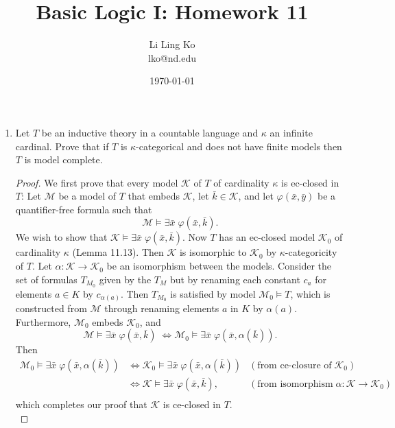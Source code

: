 \documentclass{article}
\begin{document}
\title{Basic Logic I: Homework 11}
\author{Li Ling Ko\\ lko@nd.edu}
\date{\today}
\maketitle

\begin{enumerate}[label={\bf Q\arabic*:}]
  \item Let $T$ be an inductive theory in a countable language and $\kappa$
    an infinite cardinal. Prove that if $T$ is $\kappa$-categorical and
    does not have finite models then $T$ is model complete.

    \begin{proof}
      We first prove that every model $\mathcal{K}$ of $T$ of cardinality
      $\kappa$ is ec-closed in $T$: Let $\mathcal{M}$ be a model of $T$
      that embeds $\mathcal{K}$, let $\bar{k}\in\mathcal{K}$, and let
      $\varphi(\bar{x},\bar{y})$ be a quantifier-free formula such that
      \[\mathcal{M}\models \exists\bar{x}\; \varphi(\bar{x},\bar{k}).\] We
      wish to show that $\mathcal{K}\models \exists\bar{x}\;
      \varphi(\bar{x},\bar{k})$. Now $T$ has an ec-closed model
      $\mathcal{K}_0$ of cardinality $\kappa$ (Lemma 11.13). Then
      $\mathcal{K}$ is isomorphic to $\mathcal{K}_0$ by
      $\kappa$-categoricity of $T$. Let
      $\alpha:\mathcal{K}\rightarrow\mathcal{K}_0$ be an isomorphism
      between the models. Consider the set of formulas $T_{M_0}$ given by
      the $T_M$ but by renaming each constant $c_a$ for elements $a\in K$
      by $c_{\alpha(a)}$. Then $T_{M_0}$ is satisfied by model
      $\mathcal{M}_0\models T$, which is constructed from $\mathcal{M}$
      through renaming elements $a$ in $K$ by $\alpha(a)$. Furthermore,
      $\mathcal{M}_0$ embeds $\mathcal{K}_0$, and
      \[\mathcal{M}\models \exists\bar{x}\; \varphi(\bar{x},\bar{k})\;
        \Leftrightarrow \mathcal{M}_0\models
        \exists\bar{x}\; \varphi(\bar{x},\alpha(\bar{k})).\]
      Then
      \begin{align*}
        \mathcal{M}_0\models \exists\bar{x}\;
          \varphi(\bar{x},\alpha(\bar{k})) &\Leftrightarrow
            \mathcal{K}_0\models \exists\bar{x}\;
            \varphi(\bar{x},\alpha(\bar{k})) &(\text{from ce-closure of}\;
            \mathcal{K}_0) \\
          &\Leftrightarrow \mathcal{K}\models
            \exists\bar{x}\; \varphi(\bar{x},\bar{k}),
            &(\text{from isomorphism}\;
            \alpha:\mathcal{K}\rightarrow\mathcal{K}_0) \\
      \end{align*}
      which completes our proof that $\mathcal{K}$ is ce-closed in $T$. \\


\end{proof}
\end{enumerate}
\end{document}
